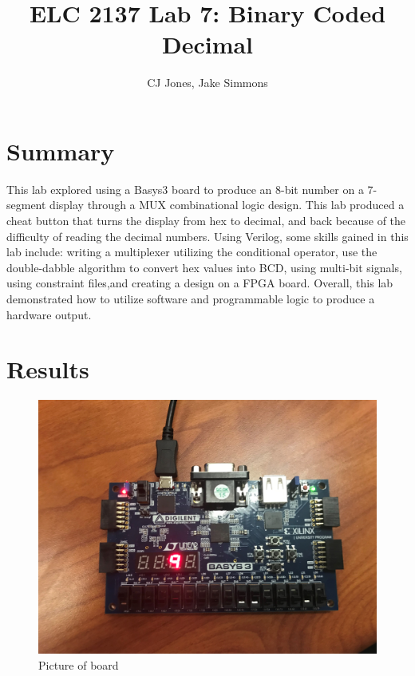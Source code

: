 \documentclass[11pt]{article}
\begin{document}
\title{ELC 2137 Lab 7: Binary Coded Decimal}
\author{CJ Jones, Jake Simmons}

\maketitle


\section*{Summary}

This lab explored using a Basys3 board to produce an 8-bit number on a 7-segment display through a MUX combinational logic design. This lab produced a cheat button that turns the display from hex to decimal, and back because of the difficulty of reading the decimal numbers. Using Verilog, some skills gained in this lab include: writing a multiplexer utilizing the conditional operator, use the double-dabble algorithm to convert hex values into BCD, using multi-bit signals, using constraint files,and creating a design on a FPGA board. Overall, this lab demonstrated how to utilize software and programmable logic to produce a hardware output.








\section*{Results}


\begin{figure}[ht]\centering
	\includegraphics[width=1.0\textwidth]{9}
	\caption{Picture of board}
	\label{fig:sim_with_table}
\end{figure}
\end{document}
